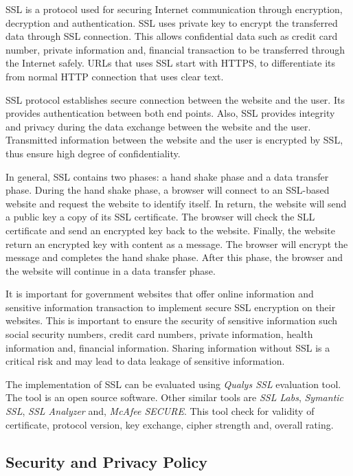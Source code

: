 \documentclass[conference]{IEEEtran}
\begin{document}
SSL is a protocol used for securing Internet communication through encryption, decryption and authentication\cite{freier2011secure}. SSL uses private key to encrypt the transferred data through SSL connection. This allows confidential data such as credit card number, private information and, financial transaction to be transferred through the Internet safely. URLs that uses SSL start with HTTPS, to differentiate its from normal HTTP connection that uses clear text.

SSL protocol establishes secure connection between the website and the user. Its provides authentication between both end points. Also, SSL provides integrity and privacy during the data exchange between the website and the user\cite{alnatheer2014secure}. Transmitted information between the website and the user is encrypted by SSL, thus ensure high degree of confidentiality.

In general, SSL contains two phases: a hand shake phase and a data transfer phase. During the hand shake phase, a browser will connect to an SSL-based website and request the website to identify itself. In return, the website will send a public key a copy of its SSL certificate. The browser will check the SLL certificate and send an encrypted key back to the website. Finally, the website return an encrypted key with content as a message.
The browser will encrypt the message and completes the hand shake phase. After this phase, the browser and the website will continue in a data transfer phase.

It is important for government websites that offer online information and sensitive information transaction to implement secure SSL encryption on their websites. This is important to ensure the security of sensitive information such social security numbers, credit card numbers, private information, health information and, financial information. Sharing information without SSL is a critical risk and may lead to data leakage of sensitive information.

The implementation of SSL can be evaluated using \emph{Qualys SSL} evaluation tool. The tool is an open source software. Other similar tools are \emph{SSL Labs}, \emph{Symantic SSL}, \emph{SSL Analyzer} and, \emph{McAfee SECURE}. This tool check for validity of certificate, protocol version, key exchange, cipher strength and, overall rating.

\subsection{Security and Privacy Policy}
\end{document}
